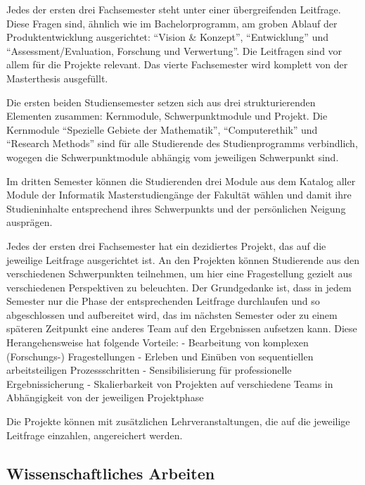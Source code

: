 Jedes der ersten drei Fachsemester steht unter einer übergreifenden
Leitfrage. Diese Fragen sind, ähnlich wie im Bachelorprogramm, am groben
Ablauf der Produktentwicklung ausgerichtet: ``Vision \& Konzept'',
``Entwicklung'' und ``Assessment/Evaluation, Forschung und Verwertung''.
Die Leitfragen sind vor allem für die Projekte relevant. Das vierte
Fachsemester wird komplett von der Masterthesis ausgefüllt.

Die ersten beiden Studiensemester setzen sich aus drei strukturierenden
Elementen zusammen: Kernmodule, Schwerpunktmodule und Projekt. Die
Kernmodule ``Spezielle Gebiete der Mathematik'', ``Computerethik'' und
``Research Methods'' sind für alle Studierende des Studienprogramms
verbindlich, wogegen die Schwerpunktmodule abhängig vom jeweiligen
Schwerpunkt sind.

Im dritten Semester können die Studierenden drei Module aus dem Katalog
aller Module der Informatik Masterstudiengänge der Fakultät wählen und
damit ihre Studieninhalte entsprechend ihres Schwerpunkts und der
persönlichen Neigung ausprägen.

Jedes der ersten drei Fachsemester hat ein dezidiertes Projekt, das auf
die jeweilige Leitfrage ausgerichtet ist. An den Projekten können
Studierende aus den verschiedenen Schwerpunkten teilnehmen, um hier eine
Fragestellung gezielt aus verschiedenen Perspektiven zu beleuchten. Der
Grundgedanke ist, dass in jedem Semester nur die Phase der
entsprechenden Leitfrage durchlaufen und so abgeschlossen und
aufbereitet wird, das im nächsten Semester oder zu einem späteren
Zeitpunkt eine anderes Team auf den Ergebnissen aufsetzen kann. Diese
Herangehensweise hat folgende Vorteile: - Bearbeitung von komplexen
(Forschungs-) Fragestellungen - Erleben und Einüben von sequentiellen
arbeitsteiligen Prozessschritten - Sensibilisierung für professionelle
Ergebnissicherung - Skalierbarkeit von Projekten auf verschiedene Teams
in Abhängigkeit von der jeweiligen Projektphase

Die Projekte können mit zusätzlichen Lehrveranstaltungen, die auf die
jeweilige Leitfrage einzahlen, angereichert werden.

\subsection{Wissenschaftliches
Arbeiten}\label{wissenschaftliches-arbeiten-1}

